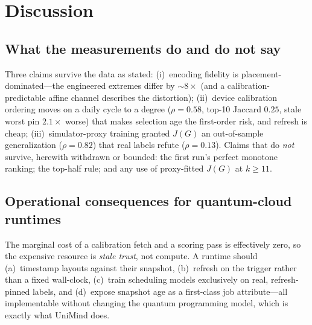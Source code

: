 \documentclass[journal,10pt,twocolumn]{IEEEtran}
\begin{document}
\section{Discussion}
\label{sec:discussion}
\subsection{What the measurements do and do not say}
Three claims survive the data as stated: (i)~encoding fidelity is placement-dominated---the engineered extremes
differ by $\sim8\times$ (and a calibration-predictable affine channel describes the distortion); (ii)~device
calibration ordering moves on a daily cycle to a degree ($\rho{=}0.58$, top-10 Jaccard $0.25$, stale worst pin
$2.1\times$ worse) that makes selection age the first-order risk, and refresh is cheap; (iii)~simulator-proxy
training granted $J(G)$ an out-of-sample generalization ($\rho{=}0.82$) that real labels refute
($\rho{=}0.13$). Claims that do \emph{not} survive, herewith withdrawn or bounded: the first run's perfect monotone
ranking; the top-half rule; and any use of proxy-fitted $J(G)$ at $k\ge11$.

\subsection{Operational consequences for quantum-cloud runtimes}
The marginal cost of a calibration fetch and a scoring pass is effectively zero, so the expensive resource is
\emph{stale trust}, not compute. A runtime should (a)~timestamp layouts against their snapshot, (b)~refresh on the
trigger rather than a fixed wall-clock, (c)~train scheduling models exclusively on real, refresh-pinned labels, and
(d)~expose snapshot age as a first-class job attribute---all implementable without changing the quantum programming
model, which is exactly what UniMind does.
\end{document}

